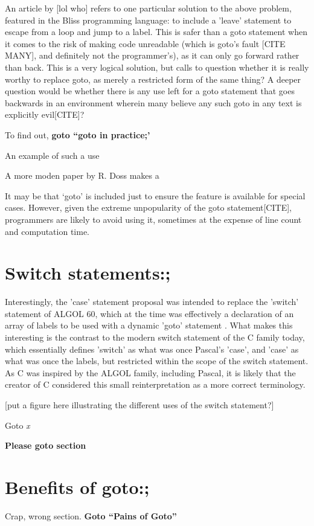 \documentclass{journal}
\begin{document}
An article by [lol who]\cite{againstgoto} refers to one particular solution to the above problem, featured in the Bliss programming language: to include a 'leave' statement to escape from a loop and jump to a label. This is safer than a goto statement when it comes to the risk of making code unreadable (which is goto's fault [CITE MANY], and definitely not the programmer's), as it can only go forward rather than back. This is a very logical solution, but calls to question whether it is really worthy to replace goto, as merely a restricted form of the same thing? A deeper question would be whether there is any use left for a goto statement that goes backwards in an environment wherein many believe any such goto in any text is explicitly evil[CITE]?

To find out, \textbf{goto ``goto in practice;'}

An example of such a use 

A more moden paper by R. Doss makes a 

It may be that `goto' is included just to ensure the feature is available for special cases. However, given the extreme unpopularity of the goto statement[CITE], programmers are likely to avoid using it, sometimes at the expense of line count and computation time.

\section{Switch statements:;}
Interestingly, the 'case' statement proposal was intended to replace the 'switch' statement of ALGOL 60, which at the time was effectively a declaration of an array of labels to be used with a dynamic 'goto' statement \cite{algolguide}. What makes this interesting is the contrast to the modern switch statement of the C family today, which essentially defines 'switch' as what was once Pascal's 'case', and 'case' as what was once the labels, but restricted within the scope of the switch statement. As C was inspired by the ALGOL family, including Pascal, it is likely that the creator of C considered this small reinterpretation as a more correct terminology.

[put a figure here illustrating the different uses of the switch statement?]

Goto \textit{x}

\textbf{Please goto section }

\section{Benefits of goto:;}
Crap, wrong section. \textbf{Goto ``Pains of Goto''}
\end{document}
